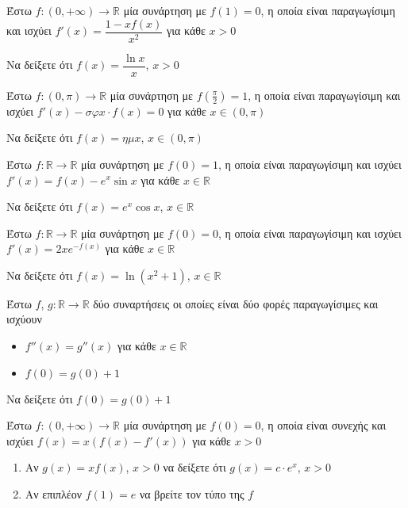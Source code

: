 \documentclass{presentation}
\begin{document}
\begin{askisi}
  Έστω $f:(0,+\infty)\to\mathbb{R}$ μία συνάρτηση με $f(1)=0$, η οποία είναι παραγωγίσιμη και ισχύει $f'(x)=\dfrac{1-xf(x)}{x^2}$ για κάθε $x>0$

  Να δείξετε ότι $f(x)=\dfrac{\ln x}{x}$, $x>0$

\end{askisi}

\begin{askisi}
  Έστω $f:(0,π)\to\mathbb{R}$ μία συνάρτηση με $f(\frac{π}{2})=1$, η οποία είναι παραγωγίσιμη και ισχύει $f'(x)-σφx\cdot f(x)=0$ για κάθε $x\in (0,π)$

  Να δείξετε ότι $f(x)=ημx$, $x\in (0,π)$

\end{askisi}

\begin{askisi}
  Έστω $f:\mathbb{R}\to\mathbb{R}$ μία συνάρτηση με $f(0)=1$, η οποία είναι παραγωγίσιμη και ισχύει $f'(x)=f(x)-e^x\sin x$ για κάθε $x\in\mathbb{R}$

  Να δείξετε ότι $f(x)=e^x\cos x$, $x\in\mathbb{R}$

\end{askisi}

\begin{askisi}
  Έστω $f:\mathbb{R}\to\mathbb{R}$ μία συνάρτηση με $f(0)=0$, η οποία είναι παραγωγίσιμη και ισχύει $f'(x)=2xe^{-f(x)}$ για κάθε $x\in\mathbb{R}$

  Να δείξετε ότι $f(x)=\ln (x^2+1)$, $x\in\mathbb{R}$

\end{askisi}

\begin{askisi}
  Έστω $f$, $g:\mathbb{R}\to\mathbb{R}$ δύο συναρτήσεις οι οποίες είναι δύο φορές παραγωγίσιμες και ισχύουν
  \begin{itemize}
    \item $f''(x)=g''(x)$ για κάθε $x\in\mathbb{R}$
    \item $f(0)=g(0)+1$
  \end{itemize}

  Να δείξετε ότι $f(0)=g(0)+1$

\end{askisi}

\begin{askisi}
  Έστω $f:(0,+\infty)\to\mathbb{R}$ μία συνάρτηση με $f(0)=0$, η οποία είναι συνεχής και ισχύει $f(x)=x(f(x)-f'(x))$ για κάθε $x>0$
  \begin{enumerate}
    \item<1-> Αν $g(x)=xf(x)$, $x>0$ να δείξετε ότι $g(x)=c\cdot e^x$, $x>0$
    \item<2-> Αν επιπλέον $f(1)=e$ να βρείτε τον τύπο της $f$
  \end{enumerate}

\end{askisi}
\end{document}
